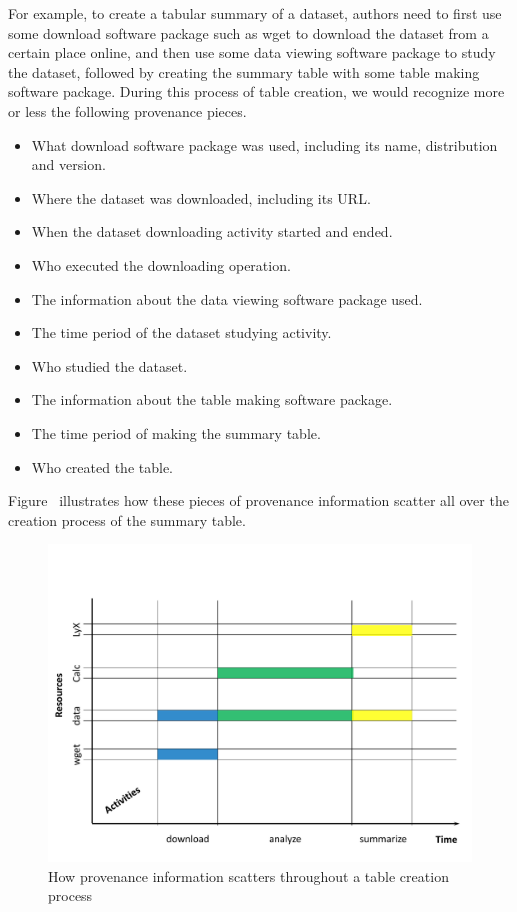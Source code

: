 For example, to create a tabular summary of a dataset, authors need to first use some download software package such as wget to download the dataset from a certain place online, and then use some data viewing software package to study the dataset, followed by creating the summary table with some table making software package. During this process of table creation, we would recognize more or less the following provenance pieces.
\begin{itemize}
\item What download software package was used, including its name, distribution and version.
\item Where the dataset was downloaded, including its URL.
\item When the dataset downloading activity started and ended.
\item Who executed the downloading operation.
\item The information about the data viewing software package used.
\item The time period of the dataset studying activity.
\item Who studied the dataset.
\item The information about the table making software package.
\item The time period of making the summary table.
\item Who created the table.
\end{itemize}
Figure~\cite{prov-pieces} illustrates how these pieces of provenance information scatter all over the creation process of the summary table.
\begin{figure}
\label{prov-pieces}
\centering
\includegraphics[scale=0.5]{prov-pieces}
\caption{How provenance information scatters throughout a table creation process}
\end{figure}
